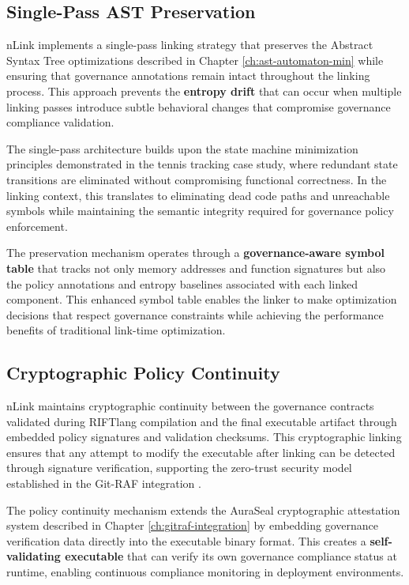 \subsection{Single-Pass AST Preservation}

nLink implements a single-pass linking strategy that preserves the Abstract Syntax Tree optimizations described in Chapter \ref{ch:ast-automaton-min} while ensuring that governance annotations remain intact throughout the linking process. This approach prevents the \textbf{entropy drift} that can occur when multiple linking passes introduce subtle behavioral changes that compromise governance compliance validation.

The single-pass architecture builds upon the state machine minimization principles demonstrated in the tennis tracking case study, where redundant state transitions are eliminated without compromising functional correctness. In the linking context, this translates to eliminating dead code paths and unreachable symbols while maintaining the semantic integrity required for governance policy enforcement.

The preservation mechanism operates through a \textbf{governance-aware symbol table} that tracks not only memory addresses and function signatures but also the policy annotations and entropy baselines associated with each linked component. This enhanced symbol table enables the linker to make optimization decisions that respect governance constraints while achieving the performance benefits of traditional link-time optimization.

\subsection{Cryptographic Policy Continuity}

nLink maintains cryptographic continuity between the governance contracts validated during RIFTlang compilation and the final executable artifact through embedded policy signatures and validation checksums. This cryptographic linking ensures that any attempt to modify the executable after linking can be detected through signature verification, supporting the zero-trust security model established in the Git-RAF integration \cite{TODO:cryptographic-continuity-spec}.

The policy continuity mechanism extends the AuraSeal cryptographic attestation system described in Chapter \ref{ch:gitraf-integration} by embedding governance verification data directly into the executable binary format. This creates a \textbf{self-validating executable} that can verify its own governance compliance status at runtime, enabling continuous compliance monitoring in deployment environments.

